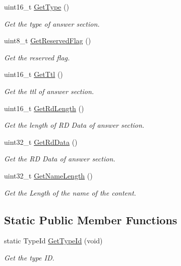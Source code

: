 \begin{DoxyCompactItemize}
uint16\-\_\-t \hyperlink{classns3_1_1DnsPlusAnswerSection_a766b46334b73e311f789842ba5e946d2}{Get\-Type} ()
\begin{DoxyCompactList}\small\item\em Get the type of answer section. \end{DoxyCompactList}\item 
uint8\-\_\-t \hyperlink{classns3_1_1DnsPlusAnswerSection_a0fcc7d52387c28ef0b6054a3d445bab2}{Get\-Reserved\-Flag} ()
\begin{DoxyCompactList}\small\item\em Get the reserved flag. \end{DoxyCompactList}\item 
uint16\-\_\-t \hyperlink{classns3_1_1DnsPlusAnswerSection_a675a24874435063a12abaacbf28caa7d}{Get\-Ttl} ()
\begin{DoxyCompactList}\small\item\em Get the ttl of answer section. \end{DoxyCompactList}\item 
uint16\-\_\-t \hyperlink{classns3_1_1DnsPlusAnswerSection_a7208ae0d866c3292f2b92de9f32fe869}{Get\-Rd\-Length} ()
\begin{DoxyCompactList}\small\item\em Get the length of R\-D Data of answer section. \end{DoxyCompactList}\item 
uint32\-\_\-t \hyperlink{classns3_1_1DnsPlusAnswerSection_ae3deac68a760812cbb49e532ac0ab2c6}{Get\-Rd\-Data} ()
\begin{DoxyCompactList}\small\item\em Get the R\-D Data of answer section. \end{DoxyCompactList}\item 
uint32\-\_\-t \hyperlink{classns3_1_1DnsPlusAnswerSection_a3f52e08f71e8f5d942c5c888e997ed5f}{Get\-Name\-Length} ()
\begin{DoxyCompactList}\small\item\em Get the Length of the name of the content. \end{DoxyCompactList}\end{DoxyCompactItemize}
\subsection*{Static Public Member Functions}
\begin{DoxyCompactItemize}
\item 
static Type\-Id \hyperlink{classns3_1_1DnsPlusAnswerSection_acc0093742dd85d654eb0faf7c3492baf}{Get\-Type\-Id} (void)
\begin{DoxyCompactList}\small\item\em Get the type I\-D. \end{DoxyCompactList}\end{DoxyCompactItemize}
